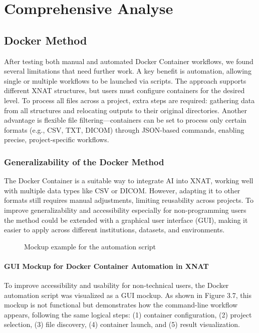 \chapter{Comprehensive Analyse}
\section{Docker Method}

After testing both manual and automated Docker Container workflows, we found several limitations that need further work. A key benefit is automation, allowing single or multiple workflows to be launched via scripts. The approach supports different XNAT structures, but users must configure containers for the desired level. To process all files across a project, extra steps are required: gathering data from all structures and relocating outputs to their original directories. Another advantage is flexible file filtering—containers can be set to process only certain formats (e.g., CSV, TXT, DICOM) through JSON-based commands, enabling precise, project-specific workflows.

\subsection{Generalizability of the Docker Method}
The Docker Container is a suitable way to integrate AI into XNAT, working well with multiple data types like CSV or DICOM. However, adapting it to other formats still requires manual adjustments, limiting reusability across projects. To improve generalizability and accessibility especially for non-programming users the method could be extended with a graphical user interface (GUI), making it easier to apply across different institutions, datasets, and environments. 
\begin{figure}[H]
    \centering
    \def\svgwidth{\linewidth} 
    
    \caption{Mockup example for the automation script}
    \label{fig:workflowxnat}
\end{figure}
\normalsize
\subsubsection{GUI Mockup for Docker Container Automation in XNAT}

To improve accessibility and usability for non-technical users, the Docker automation script was visualized as a GUI mockup. As shown in Figure 3.7, this mockup is not functional but demonstrates how the command-line workflow appears, following the same logical steps: (1) container configuration, (2) project selection, (3) file discovery, (4) container launch, and (5) result visualization.
